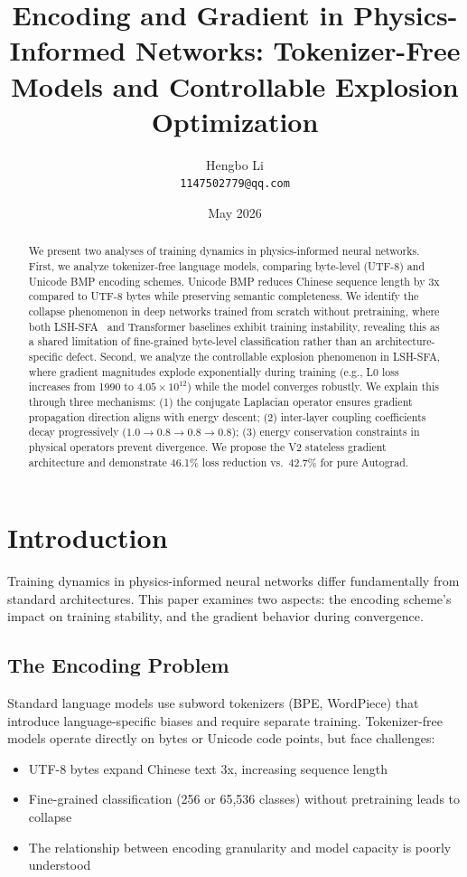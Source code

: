 \documentclass{article}
\title{Encoding and Gradient in Physics-Informed Networks: Tokenizer-Free Models and Controllable Explosion Optimization}
\author{Hengbo Li\\
\texttt{1147502779@qq.com}
}
\date{May 2026}
\begin{document}
\maketitle

\begin{abstract}
We present two analyses of training dynamics in physics-informed neural networks. First, we analyze tokenizer-free language models, comparing byte-level (UTF-8) and Unicode BMP encoding schemes. Unicode BMP reduces Chinese sequence length by 3x compared to UTF-8 bytes while preserving semantic completeness. We identify the collapse phenomenon in deep networks trained from scratch without pretraining, where both LSH-SFA~\cite{lsh-sfa} and Transformer baselines exhibit training instability, revealing this as a shared limitation of fine-grained byte-level classification rather than an architecture-specific defect. Second, we analyze the controllable explosion phenomenon in LSH-SFA, where gradient magnitudes explode exponentially during training (e.g., L0 loss increases from 1990 to $4.05 \times 10^{12}$) while the model converges robustly. We explain this through three mechanisms: (1) the conjugate Laplacian operator ensures gradient propagation direction aligns with energy descent; (2) inter-layer coupling coefficients decay progressively ($1.0 \rightarrow 0.8 \rightarrow 0.8 \rightarrow 0.8$); (3) energy conservation constraints in physical operators prevent divergence. We propose the V2 stateless gradient architecture and demonstrate 46.1\% loss reduction vs.\ 42.7\% for pure Autograd.
\end{abstract}

\section{Introduction}

Training dynamics in physics-informed neural networks differ fundamentally from standard architectures. This paper examines two aspects: the encoding scheme's impact on training stability, and the gradient behavior during convergence.

\subsection{The Encoding Problem}

Standard language models use subword tokenizers (BPE, WordPiece) that introduce language-specific biases and require separate training. Tokenizer-free models operate directly on bytes or Unicode code points, but face challenges:
\begin{itemize}
\item UTF-8 bytes expand Chinese text 3x, increasing sequence length
\item Fine-grained classification (256 or 65,536 classes) without pretraining leads to collapse
\item The relationship between encoding granularity and model capacity is poorly understood
\end{itemize}
\end{document}
